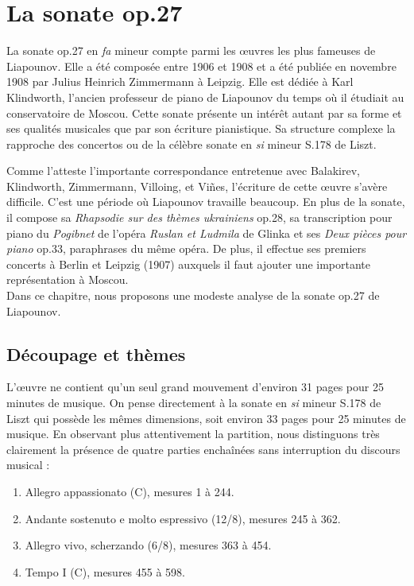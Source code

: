 
\chapter{La sonate op.27}

La sonate op.27 en \emph{fa} mineur compte parmi les œuvres les plus fameuses de Liapounov. Elle a été composée entre 1906 et 1908 et a été publiée en novembre 1908 par Julius Heinrich Zimmermann à Leipzig. Elle est dédiée à Karl Klindworth, l'ancien professeur de piano de Liapounov du temps où il étudiait au conservatoire de Moscou. Cette sonate présente un intérêt autant par sa forme et ses qualités musicales que par son écriture pianistique. Sa structure complexe la rapproche des concertos ou de la célèbre sonate en \emph{si} mineur S.178 de Liszt.

Comme l'atteste l'importante correspondance entretenue avec Balakirev, Klindworth, Zimmermann, Villoing, et Viñes, l'écriture de cette œuvre s'avère difficile. C'est une période où Liapounov travaille beaucoup. En plus de la sonate, il compose sa \emph{Rhapsodie sur des thèmes ukrainiens} op.28, sa transcription pour piano du \emph{Pogibnet} de l'opéra \emph{Ruslan et Ludmila} de Glinka et ses \emph{Deux pièces pour piano} op.33, paraphrases du même opéra. De plus, il effectue ses premiers concerts à Berlin et Leipzig (1907) auxquels il faut ajouter une importante représentation à Moscou.\\

Dans ce chapitre, nous proposons une modeste analyse de la sonate op.27 de Liapounov.

\section{Découpage et thèmes}

L'œuvre ne contient qu'un seul grand mouvement d'environ 31 pages pour 25 minutes de musique. On pense directement à la sonate en \emph{si} mineur S.178 de Liszt qui possède les mêmes dimensions, soit environ 33 pages pour 25 minutes de musique. En observant plus attentivement la partition, nous distinguons très clairement la présence de quatre parties enchaînées sans interruption du discours musical :
\begin{enumerate}
  \item Allegro appassionato (C), mesures 1 à 244.
  \item Andante sostenuto e molto espressivo (12/8), mesures 245 à 362.
  \item Allegro vivo, scherzando (6/8), mesures 363 à 454.
  \item Tempo I (C), mesures 455 à 598.\\
\end{enumerate}

